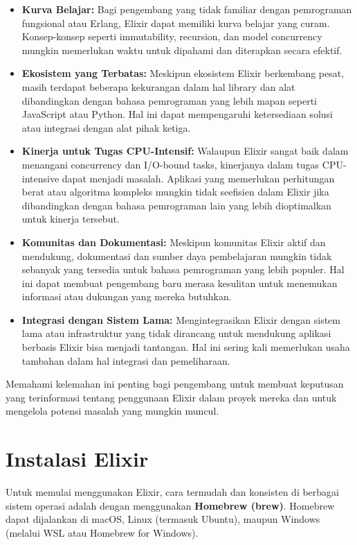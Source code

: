 \begin{itemize}
	\item \textbf{Kurva Belajar:} Bagi pengembang yang tidak familiar dengan pemrograman fungsional atau Erlang, Elixir dapat memiliki kurva belajar yang curam. Konsep-konsep seperti immutability, recursion, dan model concurrency mungkin memerlukan waktu untuk dipahami dan diterapkan secara efektif.
	
	\item \textbf{Ekosistem yang Terbatas:} Meskipun ekosistem Elixir berkembang pesat, masih terdapat beberapa kekurangan dalam hal library dan alat dibandingkan dengan bahasa pemrograman yang lebih mapan seperti JavaScript atau Python. Hal ini dapat mempengaruhi ketersediaan solusi atau integrasi dengan alat pihak ketiga.
	
	\item \textbf{Kinerja untuk Tugas CPU-Intensif:} Walaupun Elixir sangat baik dalam menangani concurrency dan I/O-bound tasks, kinerjanya dalam tugas CPU-intensive dapat menjadi masalah. Aplikasi yang memerlukan perhitungan berat atau algoritma kompleks mungkin tidak seefisien dalam Elixir jika dibandingkan dengan bahasa pemrograman lain yang lebih dioptimalkan untuk kinerja tersebut.
	
	\item \textbf{Komunitas dan Dokumentasi:} Meskipun komunitas Elixir aktif dan mendukung, dokumentasi dan sumber daya pembelajaran mungkin tidak sebanyak yang tersedia untuk bahasa pemrograman yang lebih populer. Hal ini dapat membuat pengembang baru merasa kesulitan untuk menemukan informasi atau dukungan yang mereka butuhkan.
	
	\item \textbf{Integrasi dengan Sistem Lama:} Mengintegrasikan Elixir dengan sistem lama atau infrastruktur yang tidak dirancang untuk mendukung aplikasi berbasis Elixir bisa menjadi tantangan. Hal ini sering kali memerlukan usaha tambahan dalam hal integrasi dan pemeliharaan.
\end{itemize}

Memahami kelemahan ini penting bagi pengembang untuk membuat keputusan yang terinformasi tentang penggunaan Elixir dalam proyek mereka dan untuk mengelola potensi masalah yang mungkin muncul.

\section{Instalasi Elixir}

Untuk memulai menggunakan Elixir, cara termudah dan konsisten di berbagai sistem operasi adalah dengan menggunakan \textbf{Homebrew (brew)}. Homebrew dapat dijalankan di macOS, Linux (termasuk Ubuntu), maupun Windows (melalui WSL atau Homebrew for Windows).

